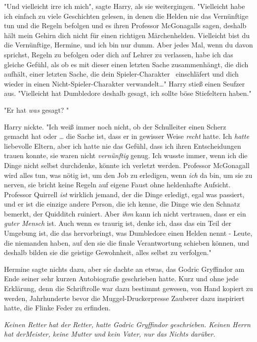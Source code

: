 {"Und vielleicht irre ich mich", sagte Harry, als sie weitergingen. "Vielleicht habe ich einfach zu viele Geschichten gelesen, in denen die Helden nie das Vernünftige tun und die Regeln befolgen und es ihren Professor McGonagalls sagen, deshalb hält mein Gehirn dich nicht für einen richtigen Märchenhelden. Vielleicht bist du die Vernünftige, Hermine, und ich bin nur dumm. Aber jedes Mal, wenn du davon sprichst, Regeln zu befolgen oder dich auf Lehrer zu verlassen, habe ich das gleiche Gefühl, als ob es mit dieser einen letzten Sache zusammenhängt, die dich aufhält, einer letzten Sache, die dein Spieler-Charakter ~einschläfert und dich wieder in einen Nicht-Spieler-Charakter verwandelt…" Harry stieß einen Seufzer aus. "Vielleicht hat Dumbledore deshalb gesagt, ich sollte böse Stiefeltern haben."

"Er hat \emph{was} gesagt? "

Harry nickte. "Ich weiß immer noch nicht, ob der Schulleiter einen Scherz gemacht hat oder … die Sache ist, dass er in gewisser Weise \emph{recht} hatte. Ich \emph{hatte} liebevolle Eltern, aber ich hatte nie das Gefühl, dass ich ihren Entscheidungen trauen konnte, sie waren nicht \emph{vernünftig} genug. Ich wusste immer, wenn ich die Dinge nicht selbst durchdenke, könnte ich verletzt werden. Professor McGonagall wird alles tun, was nötig ist, um den Job zu erledigen, wenn \emph{ich} da bin, um sie zu nerven, sie bricht keine Regeln auf eigene Faust ohne heldenhafte Aufsicht. Professor Quirrell \emph{ist} wirklich jemand, der die Dinge erledigt, egal was passiert, und er ist die einzige andere Person, die ich kenne, die Dinge wie den Schnatz bemerkt, der Quidditch ruiniert. Aber \emph{ihm} kann ich nicht vertrauen, dass er ein \emph{guter Mensch} ist. Auch wenn es traurig ist, denke ich, dass das ein Teil der Umgebung ist, die das hervorbringt, was Dumbledore einen Helden nennt - Leute, die niemanden haben, auf den sie die finale Verantwortung schieben können, und deshalb bilden sie die geistige Gewohnheit, alles selbst zu verfolgen."

Hermine sagte nichts dazu, aber sie dachte an etwas, das Godric Gryffindor am Ende seiner sehr kurzen Autobiografie geschrieben hatte. Kurz und ohne jede Erklärung, denn die Schriftrolle war dazu bestimmt gewesen, von Hand kopiert zu werden, Jahrhunderte bevor die Muggel-Druckerpresse Zauberer dazu inspiriert hatte, die Flinke Feder zu erfinden.

\emph{\emph{Keinen Retter hat der Retter}, hatte Godric Gryffindor geschrieben. \emph{Keinen Herrn} \emph{hat derMeister, keine Mutter und kein Vater, nur das Nichts darüber.}}

}

